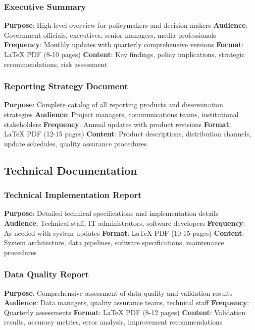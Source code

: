 \documentclass[11pt,a4paper]{article}
\begin{document}
\subsubsection{Executive Summary}
\begin{itemize}
    \textbf{Purpose}: High-level overview for policymakers and decision-makers
    \textbf{Audience}: Government officials, executives, senior managers, media professionals
    \textbf{Frequency}: Monthly updates with quarterly comprehensive versions
    \textbf{Format}: LaTeX PDF (8-10 pages)
    \textbf{Content}: Key findings, policy implications, strategic recommendations, risk assessment
\end{itemize}

\subsubsection{Reporting Strategy Document}
\begin{itemize}
    \textbf{Purpose}: Complete catalog of all reporting products and dissemination strategies
    \textbf{Audience}: Project managers, communications teams, institutional stakeholders
    \textbf{Frequency}: Annual updates with product revisions
    \textbf{Format}: LaTeX PDF (12-15 pages)
    \textbf{Content}: Product descriptions, distribution channels, update schedules, quality assurance procedures
\end{itemize}

\subsection{Technical Documentation}

\subsubsection{Technical Implementation Report}
\begin{itemize}
    \textbf{Purpose}: Detailed technical specifications and implementation details
    \textbf{Audience}: Technical staff, IT administrators, software developers
    \textbf{Frequency}: As needed with system updates
    \textbf{Format}: LaTeX PDF (10-15 pages)
    \textbf{Content}: System architecture, data pipelines, software specifications, maintenance procedures
\end{itemize}

\subsubsection{Data Quality Report}
\begin{itemize}
    \textbf{Purpose}: Comprehensive assessment of data quality and validation results
    \textbf{Audience}: Data managers, quality assurance teams, technical staff
    \textbf{Frequency}: Quarterly assessments
    \textbf{Format}: LaTeX PDF (8-12 pages)
    \textbf{Content}: Validation results, accuracy metrics, error analysis, improvement recommendations
\end{itemize}
\end{document}
